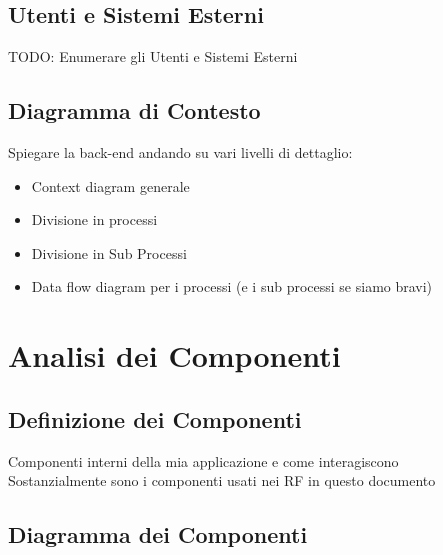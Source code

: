 \documentclass{report}
\begin{document}
\section{Utenti e Sistemi Esterni}

TODO: Enumerare gli Utenti e Sistemi Esterni

\section{Diagramma di Contesto}

Spiegare la back-end andando su vari livelli di dettaglio:
\begin{itemize}
	\item Context diagram generale
	\item Divisione in processi
	\item Divisione in Sub Processi
	\item Data flow diagram per i processi (e i sub processi se siamo bravi)
\end{itemize}
\chapter{Analisi dei Componenti}

\section{Definizione dei Componenti}

Componenti interni della mia applicazione e come interagiscono\\
Sostanzialmente sono i componenti usati nei RF in questo documento

\section{Diagramma dei Componenti}
\end{document}
